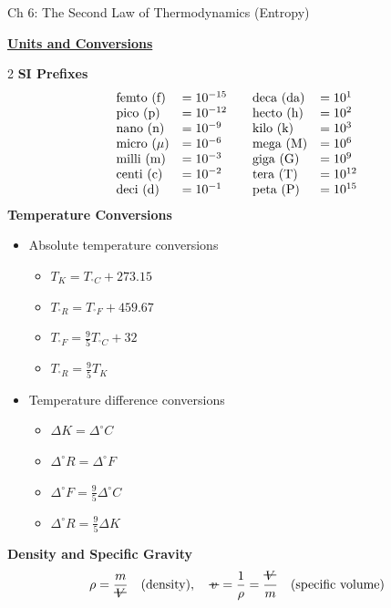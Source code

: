 \documentclass[10pt, fleqn]{article}
\newcommand{\vol}{\mathord{\text{\ooalign{\hidewidth $V$\hidewidth\cr\kern-0.5pt\raisebox{0.8ex}{\rule[0pt]{1em}{0.5pt}}}}}}
\newcommand{\svol}{%
  \mathord{\text{\ooalign{%
    \hfil$v$\hfil\cr
    \hfil\rule[0.6ex]{0.8em}{0.5pt}\hfil
  }}}%
}
\begin{document}
\begin{center}
    \normalsize Ch 6: The Second Law of Thermodynamics (Entropy)
\end{center}
\underline{\textbf{Units and Conversions}}
\begin{multicols}{2}\noindent
\textbf{SI Prefixes}
\makeatletter
\@fleqnfalse
\makeatother
\[
\begin{array}{ll@{\qquad}ll}
\text{femto (f)} &= 10^{-15} & \text{deca (da)} &= 10^{1} \\
\text{pico (p)} &= 10^{-12} & \text{hecto (h)} &= 10^{2} \\
\text{nano (n)} &= 10^{-9}  & \text{kilo (k)} &= 10^{3} \\
\text{micro ($\mu$)} &= 10^{-6} & \text{mega (M)} &= 10^{6} \\
\text{milli (m)} &= 10^{-3} & \text{giga (G)} &= 10^{9} \\
\text{centi (c)} &= 10^{-2} & \text{tera (T)} &= 10^{12} \\
\text{deci (d)} &= 10^{-1}  & \text{peta (P)} &= 10^{15}
\end{array}
\]
\makeatletter
\@fleqntrue
\makeatother
\textbf{Temperature Conversions}
\begin{itemize}[label=\textbullet]
    \item Absolute temperature conversions
    \begin{itemize}[label=\textopenbullet]
        \item $T_{K} = T_{^\circ C} + 273.15$
        \item $T_{^\circ R} = T_{^\circ F} + 459.67$
        \item $T_{^\circ F} = \frac{9}{5}T_{^\circ C} + 32$
        \item $T_{^\circ R} = \frac{9}{5}T_{K}$
    \end{itemize}
    \item Temperature difference conversions
    \begin{itemize}[label=\textopenbullet]
        \item $\Delta K = \Delta ^\circ C$
        \item $\Delta ^\circ R = \Delta ^\circ F$
        \item $\Delta ^\circ F = \frac{9}{5}\Delta ^\circ C$
        \item $\Delta ^\circ R = \frac{9}{5}\Delta K$
    \end{itemize}
\end{itemize}
\textbf{Density and Specific Gravity}
\[\rho = \frac{m}{\vol}\quad \text{(density)}, \quad \svol = \frac{1}{\rho} = \frac{\vol}{m}  \quad \text{(specific volume)}\]

\end{multicols}
\end{document}
